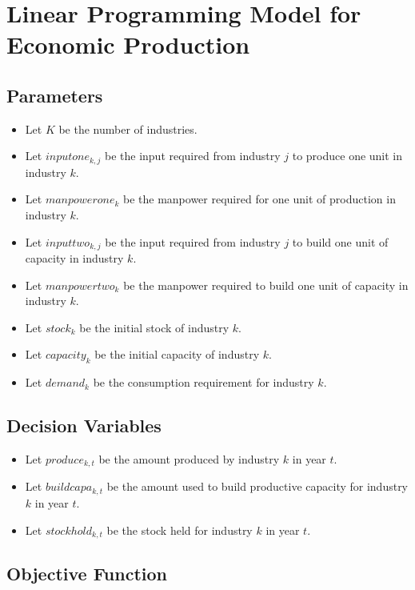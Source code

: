 \documentclass{article}
\begin{document}
\section*{Linear Programming Model for Economic Production}

\subsection*{Parameters}

\begin{itemize}
    \item Let \( K \) be the number of industries.
    \item Let \( inputone_{k,j} \) be the input required from industry \( j \) to produce one unit in industry \( k \).
    \item Let \( manpowerone_{k} \) be the manpower required for one unit of production in industry \( k \).
    \item Let \( inputtwo_{k,j} \) be the input required from industry \( j \) to build one unit of capacity in industry \( k \).
    \item Let \( manpowertwo_{k} \) be the manpower required to build one unit of capacity in industry \( k \).
    \item Let \( stock_{k} \) be the initial stock of industry \( k \).
    \item Let \( capacity_{k} \) be the initial capacity of industry \( k \).
    \item Let \( demand_{k} \) be the consumption requirement for industry \( k \).
\end{itemize}

\subsection*{Decision Variables}

\begin{itemize}
    \item Let \( produce_{k,t} \) be the amount produced by industry \( k \) in year \( t \).
    \item Let \( buildcapa_{k,t} \) be the amount used to build productive capacity for industry \( k \) in year \( t \).
    \item Let \( stockhold_{k,t} \) be the stock held for industry \( k \) in year \( t \).
\end{itemize}

\subsection*{Objective Function}
\end{document}
